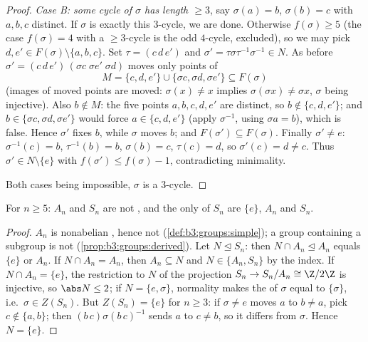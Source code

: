 \begin{proof}
\emph{Case B: some cycle of $\sigma$ has length $\geq 3$}, say
$\sigma(a) = b$, $\sigma(b) = c$ with $a, b, c$ distinct. If
$\sigma$ is exactly this $3$-cycle, we are done. Otherwise
$f(\sigma) \geq 5$ (the case $f(\sigma) = 4$ with a $\geq3$-cycle
is the odd $4$-cycle, excluded), so we may pick $d, e' \in
F(\sigma) \setminus \{a, b, c\}$. Set $\tau = (c\,d\,e')$ and
$\sigma' = \tau\sigma\tau^{-1}\sigma^{-1} \in N$. As before
$\sigma' = (c\,d\,e')\,(\sigma c\;\sigma e'\;\sigma d)$ moves only
points of
\[
M = \{c, d, e'\} \cup \{\sigma c, \sigma d, \sigma e'\}
\subseteq F(\sigma)
\]
(images of moved points are moved: $\sigma(x) \ne x$ implies
$\sigma(\sigma x) \neq \sigma x$, $\sigma$ being injective). Also
$b \notin M$: the five points $a, b, c, d, e'$ are distinct, so $b
\notin \{c, d, e'\}$; and $b \in \{\sigma c, \sigma d, \sigma
e'\}$ would force $a \in \{c, d, e'\}$ (apply $\sigma^{-1}$, using
$\sigma a = b$), which is false. Hence $\sigma'$ fixes $b$, while
$\sigma$ moves $b$; and
$F(\sigma') \subseteq F(\sigma)$. Finally $\sigma' \neq e$:
$\sigma^{-1}(c) = b$, $\tau^{-1}(b) = b$, $\sigma(b) = c$,
$\tau(c) = d$, so $\sigma'(c) = d \neq c$. Thus $\sigma' \in N
\setminus \{e\}$ with $f(\sigma') \leq f(\sigma) - 1$,
contradicting minimality.

Both cases being impossible, $\sigma$ is a $3$-cycle.
\end{proof}

\begin{corollary}\label{cor:b3:groups:snnotsolvable}
For $n \geq 5$: $A_n$ and $S_n$ are not , and the only
 of $S_n$ are $\{e\}$, $A_n$ and $S_n$.
\end{corollary}

\begin{proof}
$A_n$ is nonabelian , hence not 
(\cref{def:b3:groups:simple}); a group containing a 
subgroup is not  (\cref{prop:b3:groups:derived}). Let $N
\trianglelefteq S_n$: then $N \cap A_n \trianglelefteq A_n$ equals
$\{e\}$ or $A_n$. If $N \cap A_n = A_n$, then $A_n \subseteq N$
and $N \in \{A_n, S_n\}$ by the index. If $N \cap A_n = \{e\}$,
the restriction to $N$ of the projection $S_n \to S_n/A_n \cong
\Z/2\Z$ is injective, so $\abs N \leq 2$; if $N = \{e, \sigma\}$,
normality makes the  of $\sigma$ equal to
$\{\sigma\}$, i.e.\ $\sigma \in Z(S_n)$. But $Z(S_n) = \{e\}$ for
$n \geq 3$: if $\sigma \ne e$ moves $a$ to $b \neq a$, pick $c
\notin \{a, b\}$; then $(b\,c)\sigma(b\,c)^{-1}$ sends $a$ to $c
\ne b$, so it differs from $\sigma$. Hence $N = \{e\}$.
\end{proof}

